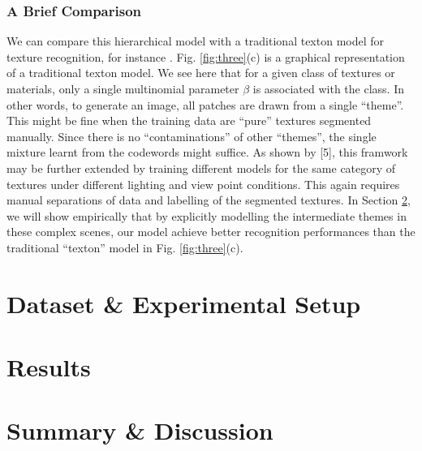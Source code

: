 \documentclass[10pt,a4paper,twocolumn]{article}
\begin{document}
\subsubsection{A Brief Comparison}
We can compare this hierarchical model with a traditional texton model for texture recognition, for instance \cite{malik, varma}. Fig. \ref{fig:three}(c) is a graphical representation of a traditional texton model. We see here that for a given class of textures or materials, only a single multinomial parameter $\beta$ is associated with the class. In other words, to generate an image, all patches are drawn from a single “theme”. This might be fine when the training data are “pure” textures segmented manually. Since there is no “contaminations” of other “themes”, the single mixture learnt from the codewords might suffice. As shown by [5], this framwork may be further extended by training different models for the same category of textures under different lighting and view point conditions. This again requires manual separations of data and labelling of the segmented textures. In Section \ref{results}, we will show empirically that by explicitly modelling the intermediate themes in these complex scenes, our model achieve better recognition performances than the traditional “texton” model in Fig. \ref{fig:three}(c).

\section{Dataset \& Experimental Setup} \label{secdataset}
\section{Results} \label{results}
\section{Summary \& Discussion} \label{summary}
\end{document}
